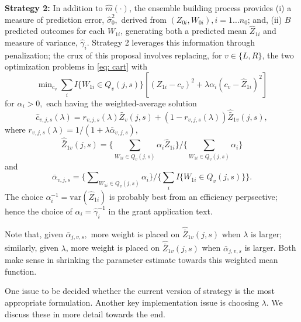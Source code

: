 \documentclass[12pt]{article}
\begin{document}
{\bf Strategy 2:} In addition to $\widehat{m}(\cdot)$, the
ensemble building process provides
(i) a measure of prediction error,
$\hat{\sigma}^2_0,$ derived from $(Z_{0i}, W_{0i}), i = 1 \ldots n_0$;
and, (ii) $B$ predicted outcomes for each $W_{1i}$, generating
both a predicted mean $\widehat{Z}_{1i}$ and measure of
variance, $\hat{\gamma}_{i}.$ Strategy 2 leverages this
information through penalization;
the crux of this proposal involves replacing,
for $v \in \{L,R\}$, the two optimization problems in
\eqref{eq: cart} with
\begin{equation}
  \label{bigopt}
  \min\nolimits_{c_v} {\textstyle \sum\nolimits}_i I\{W_{1i} \in
  Q_{v}(j,s)\} \left[ (Z_{1i}-c_v)^2 + \lambda \alpha_i
    (c_v-\widehat{Z}_{1i})^2 \right]
\end{equation}
for $\alpha_i > 0,$ each having the weighted-average solution 
\[
\widehat{c}_{v,j,s}(\lambda) =
r_{v,j,s}(\lambda) \bar{Z}_v(j,s) + (1-r_{v,j,s}(\lambda)) \hat{\bar{Z}}_{1v}(j,s),
\]
where $r_{v,j,s}(\lambda) = 1/(1 + \lambda \bar{\alpha}_{v,j,s}),$
\[
\hat{\bar{Z}}_{1v}(j,s) =
\{ {\textstyle \sum\nolimits}_{W_{1i} \in Q_{v}(j,s)} \alpha_i  \hat{Z}_{1i} \}
/ \{ {\textstyle \sum\nolimits}_{W_{1i} \in Q_{v}(j,s)} \alpha_i \}
\]
and
\[
\bar{\alpha}_{v,j,s} = \{ \sum\nolimits_{W_{1i} \in Q_{v}(j,s)} \alpha_i \}
/ \{ \sum_i I\{ W_{1i} \in Q_{v}(j,s) \} \}.
\]
The choice $\alpha^{-1}_i = \mbox{var}( \hat{Z}_{1i} )$ is probably
best from an efficiency perpsective; hence the choice of
$\alpha_i = \hat{\gamma}^{-1}_{i}$ in the grant application text.

Note that, given $\bar{\alpha}_{j,v,s},$  more weight is placed on
$\hat{\bar{Z}}_{1v}(j,s)$ when $\lambda$ is larger; similarly, 
given $\lambda$, more weight is placed on
$\hat{\bar{Z}}_{1v}(j,s)$ when $\bar{\alpha}_{j,v,s}$ is larger.
Both make sense in shrinking the parameter estimate
towards this weighted mean function.

One issue to be decided whether the current version of strategy is the
most appropriate formulation. Another key implementation issue is
choosing $\lambda$. We discuss these in more detail towards the end.

\end{document}
